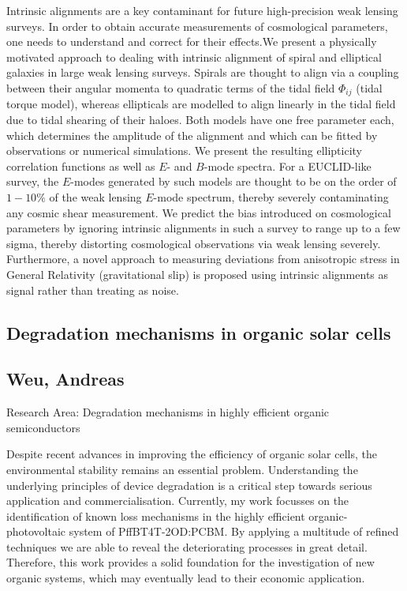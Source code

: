 \noindent Intrinsic alignments are a key contaminant for future high-precision weak lensing surveys. In order to obtain accurate measurements of cosmological parameters, one needs to understand and correct for their effects.We present a physically motivated approach to dealing with intrinsic alignment of spiral and elliptical galaxies in large weak lensing surveys. Spirals are thought to align via a coupling between their angular momenta to quadratic terms of the tidal field $\Phi_{ij}$ (tidal torque model), whereas ellipticals are modelled to align linearly in the tidal field due to tidal shearing of their haloes. Both models have one free parameter each, which determines the amplitude of the alignment and which can be fitted by observations or numerical simulations. We present the resulting ellipticity correlation functions as well as $E$- and $B$-mode spectra. For a EUCLID-like survey, the $E$-modes generated by such models are thought to be on the order of $1-10\%$ of the weak lensing $E$-mode spectrum, thereby severely contaminating any cosmic shear measurement. We predict the bias introduced on cosmological parameters by ignoring intrinsic alignments in such a survey to range up to a few sigma, thereby distorting cosmological observations via weak lensing severely. Furthermore, a novel approach to measuring deviations from anisotropic stress in General Relativity (gravitational slip) is proposed using intrinsic alignments as signal rather than treating as noise.
\subsection*{\centering \large Degradation mechanisms in organic solar cells}
\subsection*{\centering \normalsize Weu, Andreas}
Research Area: Degradation mechanisms in highly efficient organic semiconductors\newline

\noindent Despite recent advances in improving the efficiency of organic solar cells, the environmental stability remains an essential problem. Understanding the underlying principles of device degradation is a critical step towards serious application and commercialisation. Currently, my work focusses on the identification of known loss mechanisms in the highly efficient organic-photovoltaic system of PffBT4T-2OD:PCBM. By applying a multitude of refined techniques we are able to reveal the deteriorating processes in great detail. Therefore, this work provides a solid foundation for the investigation of new organic systems, which may eventually lead to their economic application.
\newpage
